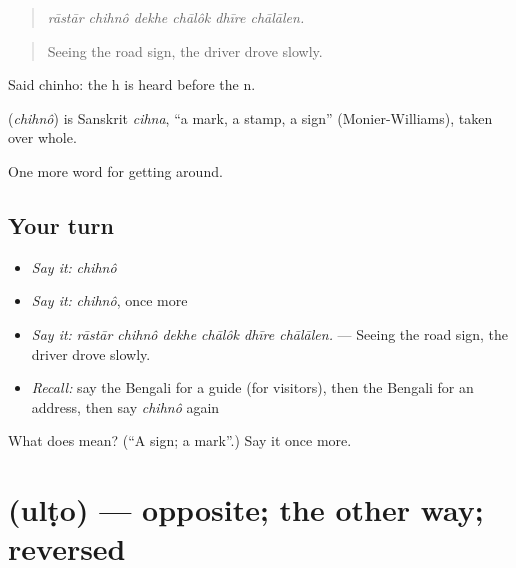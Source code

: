 \begin{quote}
     
\end{quote}

\begin{quote}
\emph{rāstār chihnô dekhe chālôk dhīre chālālen.}
\end{quote}

\begin{quote}
Seeing the road sign, the driver drove slowly.
\end{quote}

Said chinho: the h is heard before the n.

\begin{cousinweb}
\textbf{} (\emph{chihnô}) is Sanskrit \emph{cihna}, \textquotedblleft{}a mark, a stamp, a sign\textquotedblright{} (Monier-Williams), taken over whole.
\end{cousinweb}

\begin{grammarlens}[title={What you've built}]
One more word for getting around.
\end{grammarlens}

\subsection*{Your turn}
\begin{itemize}
\raggedright
  \item \emph{Say it:} \emph{chihnô}
  \item \emph{Say it:} \emph{chihnô}, once more
  \item \emph{Say it:} \emph{rāstār chihnô dekhe chālôk dhīre chālālen.} — Seeing the road sign, the driver drove slowly.
  \item \emph{Recall:} say the Bengali for a guide (for visitors), then the Bengali for an address, then say \emph{chihnô} again
\end{itemize}

\begin{tcolorbox}[breakable,colback=teal!4,colframe=teal!35!black,title={Before you move on}]
What does  mean? (\textquotedblleft{}A sign; a mark\textquotedblright{}.) Say it once more.
\end{tcolorbox}
\section[\texorpdfstring{\bn{উল্টো} (ulṭo)}{উল্টো (ulṭo)}]{ (ulṭo) — opposite; the other way; reversed}

